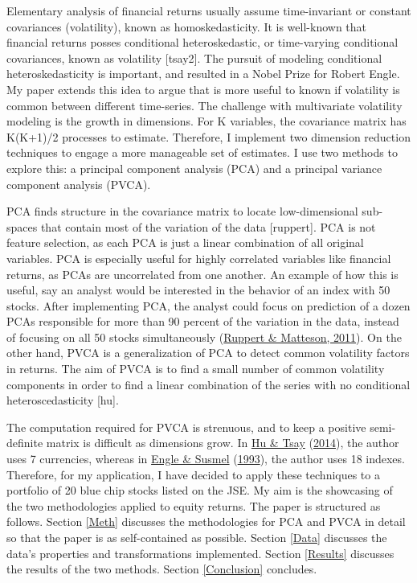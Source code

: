 \documentclass[11pt,preprint, authoryear]{elsarticle}
\numberwithin{equation}{section}
\numberwithin{figure}{section}
\numberwithin{table}{section}
\begin{document}
Elementary analysis of financial returns usually assume time-invariant
or constant covariances (volatility), known as homoskedasticity. It is
well-known that financial returns posses conditional heteroskedastic, or
time-varying conditional covariances, known as volatility {[}tsay2{]}.
The pursuit of modeling conditional heteroskedasticity is important, and
resulted in a Nobel Prize for Robert Engle. My paper extends this idea
to argue that is more useful to known if volatility is common between
different time-series. The challenge with multivariate volatility
modeling is the growth in dimensions. For K variables, the covariance
matrix has K(K+1)/2 processes to estimate. Therefore, I implement two
dimension reduction techniques to engage a more manageable set of
estimates. I use two methods to explore this: a principal component
analysis (PCA) and a principal variance component analysis (PVCA).

PCA finds structure in the covariance matrix to locate low-dimensional
sub-spaces that contain most of the variation of the data {[}ruppert{]}.
PCA is not feature selection, as each PCA is just a linear combination
of all original variables. PCA is especially useful for highly
correlated variables like financial returns, as PCAs are uncorrelated
from one another. An example of how this is useful, say an analyst would
be interested in the behavior of an index with 50 stocks. After
implementing PCA, the analyst could focus on prediction of a dozen PCAs
responsible for more than 90 percent of the variation in the data,
instead of focusing on all 50 stocks simultaneously
(\protect\hyperlink{ref-ruppert}{Ruppert \& Matteson, 2011}). On the
other hand, PVCA is a generalization of PCA to detect common volatility
factors in returns. The aim of PVCA is to find a small number of common
volatility components in order to find a linear combination of the
series with no conditional heteroscedasticity {[}hu{]}.

The computation required for PVCA is strenuous, and to keep a positive
semi-definite matrix is difficult as dimensions grow. In
\protect\hyperlink{ref-hu}{Hu \& Tsay}
(\protect\hyperlink{ref-hu}{2014}), the author uses 7 currencies,
whereas in \protect\hyperlink{ref-engle}{Engle \& Susmel}
(\protect\hyperlink{ref-engle}{1993}), the author uses 18 indexes.
Therefore, for my application, I have decided to apply these techniques
to a portfolio of 20 blue chip stocks listed on the JSE. My aim is the
showcasing of the two methodologies applied to equity returns. The paper
is structured as follows. Section \ref{Meth} discusses the methodologies
for PCA and PVCA in detail so that the paper is as self-contained as
possible. Section \ref{Data} discusses the data's properties and
transformations implemented. Section \ref{Results} discusses the results
of the two methods. Section \ref{Conclusion} concludes.
\end{document}

